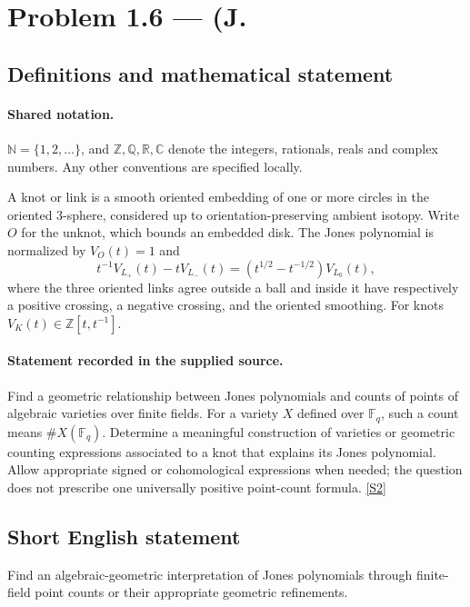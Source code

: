 \documentclass[11pt]{article}
\newcommand{\sref}[2]{\hyperlink{source:#1:#2}{[S#2]}}
\begin{document}
\section{Problem 1.6 — (J.}\label{statement}

\subsection{Definitions and mathematical statement}

\paragraph{Shared notation.}$\mathbb N=\{1,2,\ldots\}$, and $\mathbb Z,\mathbb Q,\mathbb R,\mathbb C$ denote the integers, rationals, reals and complex numbers. Any other conventions are specified locally.


A knot or link is a smooth oriented embedding of one or more circles in the oriented $3$-sphere, considered up to orientation-preserving ambient isotopy. Write $O$ for the unknot, which bounds an embedded disk. The Jones polynomial is normalized by $V_O(t)=1$ and
\[t^{-1}V_{L_+}(t)-tV_{L_-}(t)=(t^{1/2}-t^{-1/2})V_{L_0}(t),\]
where the three oriented links agree outside a ball and inside it have respectively a positive crossing, a negative crossing, and the oriented smoothing. For knots $V_K(t)\in\mathbb Z[t,t^{-1}]$.
\paragraph{Statement recorded in the supplied source.}
Find a geometric relationship between Jones polynomials and counts of points of algebraic varieties over finite fields. For a variety $X$ defined over $\mathbb F_q$, such a count means $\#X(\mathbb F_q)$. Determine a meaningful construction of varieties or geometric counting expressions associated to a knot that explains its Jones polynomial. Allow appropriate signed or cohomological expressions when needed; the question does not prescribe one universally positive point-count formula. \sref{statement}{2}
\subsection{Short English statement}
Find an algebraic-geometric interpretation of Jones polynomials through finite-field point counts or their appropriate geometric refinements.
\end{document}

